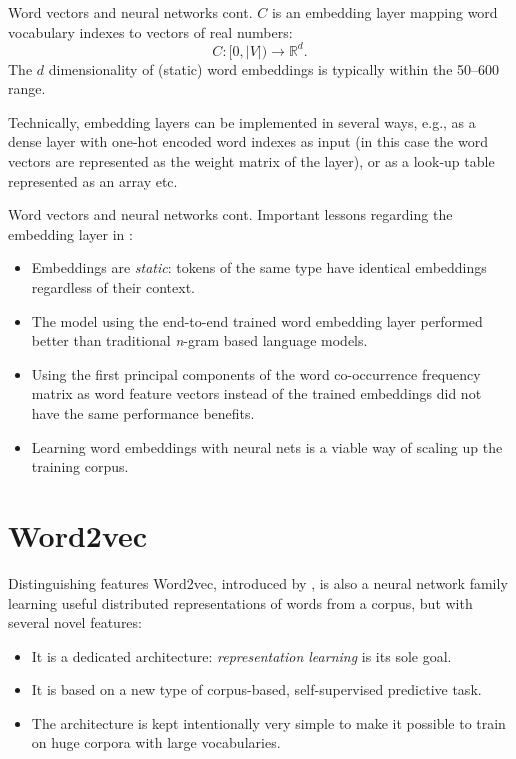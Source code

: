 \documentclass[style=upen, size=14pt]{powerdot}
\theoremstyle{definition}
\begin{document}
\begin{slide}[toc=]{Word vectors and neural networks cont.}
  $C$ is an embedding layer mapping word vocabulary indexes to vectors of real
  numbers:
  $$
  C: [0, |V|)  \rightarrow \mathbb R^d.
  $$
  The $d$ dimensionality of (static) word embeddings is typically within the
  50--600 range.

  Technically, embedding layers can be implemented in several ways, e.g., as a
  dense layer with one-hot encoded word indexes as input (in this case the word
  vectors are represented as the weight matrix of the layer), or as a look-up
  table represented as an array etc.
\end{slide}

\begin{slide}[toc=]{Word vectors and neural networks cont.}
  Important lessons regarding the embedding layer in \cite{bengio2003neural}:
  \begin{itemize}
  \item Embeddings are \emph{static}: tokens of the same type have identical
    embeddings regardless of their context.
  \item The model using the end-to-end trained word embedding layer performed
    better than traditional \emph{n}-gram based language models.
  \item Using the first principal components of the word co-occurrence frequency
    matrix as word feature vectors instead of the trained embeddings did not
    have the same performance benefits.
  \item Learning word embeddings with neural nets is a viable way of scaling up
    the training corpus. 
  \end{itemize}
\end{slide}

\section{Word2vec}

\begin{slide}[toc=Novelties]{Distinguishing features}
  Word2vec, introduced by \cite{mikolov2013efficient}, is also a neural network
  family learning useful distributed representations of words from a corpus, but
  with several novel features:
  \begin{itemize}
  \item It is a dedicated architecture: \emph{representation learning} is its
    sole goal.
  \item It is based on a new type of corpus-based, self-supervised predictive
    task.
  \item The architecture is kept intentionally very simple to make it possible
    to train on huge corpora with large vocabularies.
  \end{itemize}
\end{slide}
\end{document}

